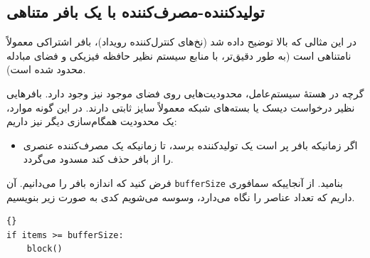 \documentclass{book}
\begin{document}
\subsection{تولیدکننده-مصرف‌کننده با یک بافر متناهی}

    در این مثالی که بالا توضیح داده شد (نخ‌های کنترل‌کننده رویداد)، بافر اشتراکی معمولاً نامتناهی است (به طور دقیق‌تر، 
    با منابع سیستم نظیر حافظه فیزیکی و فضای مبادله محدود شده است).

    گرچه در هستهٔ سیستم‌عامل، محدودیت‌هایی روی فضای موجود نیز وجود دارد. بافرهایی نظیر درخواست دیسک یا بسته‌های شبکه معمولاً سایز ثابتی دارند. 
    در این گونه موارد،‌ یک محدودیت همگام‌سازی دیگر نیز داریم:

\begin{itemize}

\item 
    اگر زمانیکه بافر پر است یک تولیدکننده برسد، تا زمانیکه یک مصرف‌کننده عنصری را از بافر حذف کند مسدود می‌گردد. 

\end{itemize}

    فرض کنید که اندازه بافر را می‌دانیم. آن {\tt bufferSize} بنامید. از آنجاییکه سمافوری داریم که تعداد عناصر را نگاه می‌دارد،‌ وسوسه می‌شویم 
    کدی به صورت زیر بنویسیم.

\begin{latin}
\begin{latin}
\begin{lstlisting}[title=\rl{راه حل معیوب بافر محدود}]{}
if items >= bufferSize:
    block()
\end{lstlisting}
\end{latin}
\end{latin}
\end{document}
